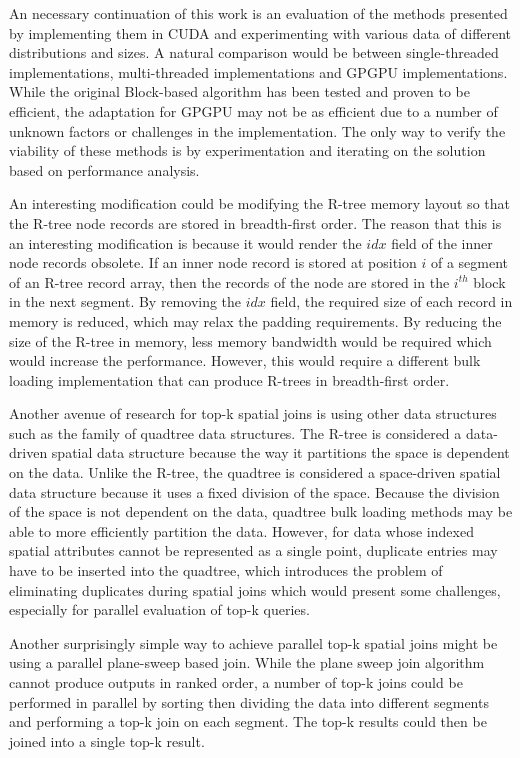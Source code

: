 An necessary continuation of this work is an evaluation of the methods presented by implementing them in CUDA and experimenting with various data of different distributions and sizes. A natural comparison would be between single-threaded implementations, multi-threaded implementations and GPGPU implementations. While the original Block-based algorithm has been tested and proven to be efficient, the adaptation for GPGPU may not be as efficient due to a number of unknown factors or challenges in the implementation. The only way to verify the viability of these methods is by experimentation and iterating on the solution based on performance analysis.

An interesting modification could be modifying the R-tree memory layout so that the R-tree node records are stored in breadth-first order. The reason that this is an interesting modification is because it would render the \(idx\) field of the inner node records obsolete. If an inner node record is stored at position \(i\) of a segment of an R-tree record array, then the records of the node are stored in the \(i^{th}\) block in the next segment. By removing the \(idx\) field, the required size of each record in memory is reduced, which may relax the padding requirements. By reducing the size of the R-tree in memory, less memory bandwidth would be required which would increase the performance. However, this would require a different bulk loading implementation that can produce R-trees in breadth-first order.

Another avenue of research for top-k spatial joins is using other data structures such as the family of quadtree data structures. The R-tree is considered a data-driven spatial data structure because the way it partitions the space is dependent on the data. Unlike the R-tree, the quadtree is considered a space-driven spatial data structure because it uses a fixed division of the space. Because the division of the space is not dependent on the data, quadtree bulk loading methods may be able to more efficiently partition the data. However, for data whose indexed spatial attributes cannot be represented as a single point, duplicate entries may have to be inserted into the quadtree, which introduces the problem of eliminating duplicates during spatial joins which would present some challenges, especially for parallel evaluation of top-k queries.

Another surprisingly simple way to achieve parallel top-k spatial joins might be using a parallel plane-sweep based join. While the plane sweep join algorithm cannot produce outputs in ranked order, a number of top-k joins could be performed in parallel by sorting then dividing the data into different segments and performing a top-k join on each segment. The top-k results could then be joined into a single top-k result.
